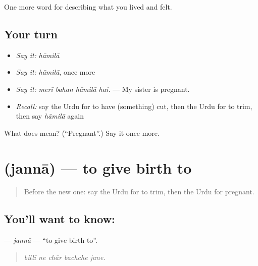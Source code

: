 \begin{grammarlens}[title={What you've built}]
One more word for describing what you lived and felt.
\end{grammarlens}

\subsection*{Your turn}
\begin{itemize}
\raggedright
  \item \emph{Say it:} \emph{hāmilā}
  \item \emph{Say it:} \emph{hāmilā}, once more
  \item \emph{Say it:} \emph{merī bahan hāmilā hai.} — My sister is pregnant.
  \item \emph{Recall:} say the Urdu for to have (something) cut, then the Urdu for to trim, then say \emph{hāmilā} again
\end{itemize}

\begin{tcolorbox}[breakable,colback=teal!4,colframe=teal!35!black,title={Before you move on}]
What does  mean? (\textquotedblleft{}Pregnant\textquotedblright{}.) Say it once more.
\end{tcolorbox}
\section[\texorpdfstring{\ur{جننا} (jannā)}{جننا (jannā)}]{ (jannā) — to give birth to}

\label{lesson:UR-C483-janna}



\begin{quote}
Before the new one: say the Urdu for to trim, then the Urdu for pregnant.
\end{quote}

\subsection*{You'll want to know: }
\textbf{} — \emph{jannā} — \textquotedblleft{}to give birth to\textquotedblright{}.

\begin{quote}
    
\end{quote}

\begin{quote}
\emph{billī ne chār bachche jane.}
\end{quote}

